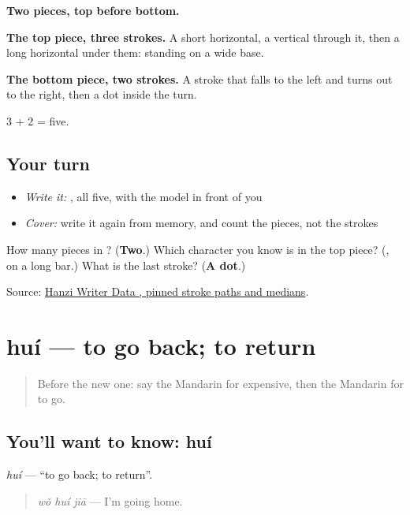 \textbf{Two pieces, top before bottom.}

\textbf{The top piece, three strokes.} A short horizontal, a vertical through it, then a long horizontal under them:  standing on a wide base.

\textbf{The bottom piece, two strokes.} A stroke that falls to the left and turns out to the right, then a dot inside the turn.

3 + 2 = five.

\subsection*{Your turn}
\begin{itemize}
\raggedright
  \item \emph{Write it:} , all five, with the model in front of you
  \item \emph{Cover:} write it again from memory, and count the pieces, not the strokes
\end{itemize}

\begin{tcolorbox}[breakable,colback=teal!4,colframe=teal!35!black,title={Before you move on}]
How many pieces in ? (\textbf{Two}.) Which character you know is in the top piece? (\textbf{}, on a long bar.) What is the last stroke? (\textbf{A dot}.)

Source: \href{https://raw.githubusercontent.com/chanind/hanzi-writer-data/68d10a4b21150cae5e1ebbd223eed289cf32d90c/data/\%E5\%8E\%BB.json}{Hanzi Writer Data , pinned stroke paths and medians}.
\end{tcolorbox}
\section[huí]{huí — to go back; to return}

\label{lesson:ZH-C43-hui}



\begin{quote}
Before the new one: say the Mandarin for expensive, then the Mandarin for to go.
\end{quote}

\subsection*{You'll want to know: huí}
\emph{huí} — \textquotedblleft{}to go back; to return\textquotedblright{}.

\begin{quote}
\emph{wǒ huí jiā} — I'm going home.
\end{quote}

